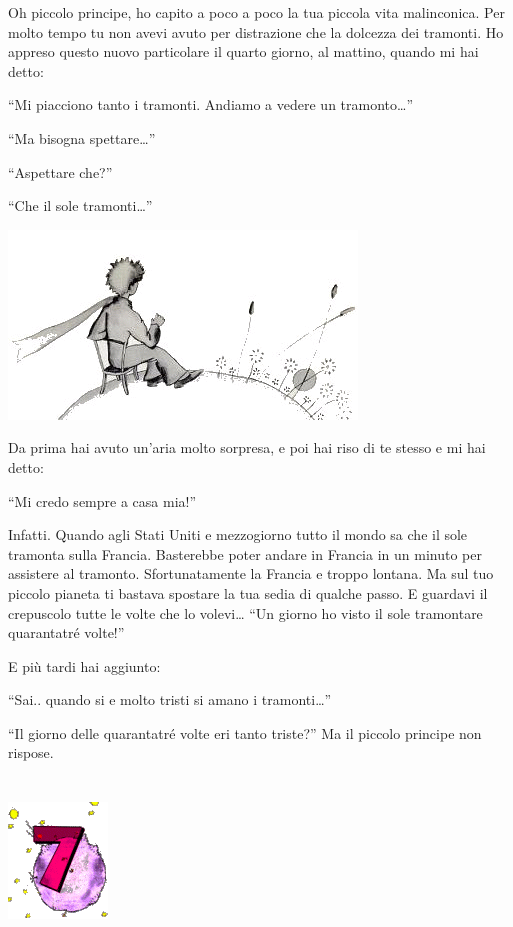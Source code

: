 \documentclass[11pt]{scrbook}
\begin{document}
Oh piccolo principe, ho capito a poco a poco la tua piccola vita
malinconica. Per molto tempo tu non avevi avuto per distrazione che la
dolcezza dei tramonti. Ho appreso questo nuovo particolare il quarto
giorno, al mattino, quando mi hai detto:

``Mi piacciono tanto i tramonti. Andiamo a vedere un tramonto\ldots{}''

``Ma bisogna spettare\ldots{}''

``Aspettare che?''

``Che il sole tramonti\ldots{}''

\begin{center}
\includegraphics{img/6a}
\end{center}

Da prima hai avuto un'aria molto sorpresa, e poi hai riso di te stesso e
mi hai detto:

``Mi credo sempre a casa mia!''

Infatti. Quando agli Stati Uniti e mezzogiorno tutto il mondo sa che il
sole tramonta sulla Francia. Basterebbe poter andare in Francia in un
minuto per assistere al tramonto. Sfortunatamente la Francia e troppo
lontana. Ma sul tuo piccolo pianeta ti bastava spostare la tua sedia di
qualche passo. E guardavi il crepuscolo tutte le volte che lo
volevi\ldots{} ``Un giorno ho visto il sole tramontare quarantatré
volte!''

E più tardi hai aggiunto:

``Sai.. quando si e molto tristi si amano i tramonti\ldots{}''

``Il giorno delle quarantatré volte eri tanto triste?'' Ma il piccolo
principe non rispose.

\chapter{}
\begin{center}
\includegraphics{img/chapter7}
\end{center}
\end{document}
